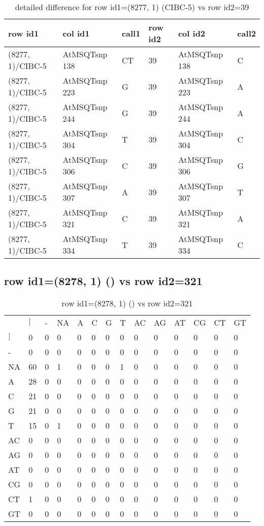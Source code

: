 \begin{center}
\begin{longtable}{|l|l|l|l|l|l|}
\caption{detailed difference for row id1=(8277, 1) (CIBC-5) vs row id2=39} \label{table_dm437}\\
\hline
row id1&col id1&call1&row id2&col id2&call2\\
\hline
(8277, 1)/CIBC-5&AtMSQTsnp 138&CT&39&AtMSQTsnp 138&C\\
(8277, 1)/CIBC-5&AtMSQTsnp 223&G&39&AtMSQTsnp 223&A\\
(8277, 1)/CIBC-5&AtMSQTsnp 244&G&39&AtMSQTsnp 244&A\\
(8277, 1)/CIBC-5&AtMSQTsnp 304&T&39&AtMSQTsnp 304&C\\
(8277, 1)/CIBC-5&AtMSQTsnp 306&C&39&AtMSQTsnp 306&G\\
(8277, 1)/CIBC-5&AtMSQTsnp 307&A&39&AtMSQTsnp 307&T\\
(8277, 1)/CIBC-5&AtMSQTsnp 321&C&39&AtMSQTsnp 321&A\\
(8277, 1)/CIBC-5&AtMSQTsnp 334&T&39&AtMSQTsnp 334&C\\
\hline
\end{longtable}
\end{center}

\subsection{row id1=(8278, 1) () vs row id2=321}
\begin{center}
\begin{longtable}{|l|l|l|l|l|l|l|l|l|l|l|l|l|l|}
\caption{row id1=(8278, 1) () vs row id2=321} \label{table_dm438}\\
\hline
\\
\hline
&$|$&-&NA&A&C&G&T&AC&AG&AT&CG&CT&GT\\
$|$&0&0&0&0&0&0&0&0&0&0&0&0&0\\
-&0&0&0&0&0&0&0&0&0&0&0&0&0\\
NA&60&0&1&0&0&0&1&0&0&0&0&0&0\\
A&28&0&0&0&0&0&0&0&0&0&0&0&0\\
C&21&0&0&0&0&0&0&0&0&0&0&0&0\\
G&21&0&0&0&0&0&0&0&0&0&0&0&0\\
T&15&0&1&0&0&0&0&0&0&0&0&0&0\\
AC&0&0&0&0&0&0&0&0&0&0&0&0&0\\
AG&0&0&0&0&0&0&0&0&0&0&0&0&0\\
AT&0&0&0&0&0&0&0&0&0&0&0&0&0\\
CG&0&0&0&0&0&0&0&0&0&0&0&0&0\\
CT&1&0&0&0&0&0&0&0&0&0&0&0&0\\
GT&0&0&0&0&0&0&0&0&0&0&0&0&0\\
\hline
\end{longtable}
\end{center}

